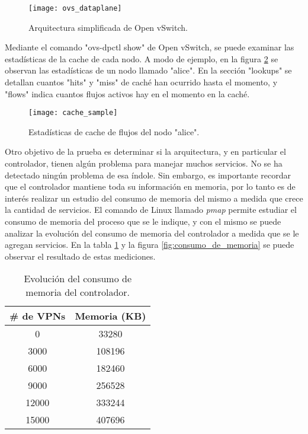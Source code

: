 \begin{figure}[t]
	\caption{Arquitectura simplificada de Open vSwitch.}
	\texttt{[image: ovs\_dataplane]}
	\centering
	\label{fig:ovs_dataplane}
\end{figure}

Mediante el comando "ovs-dpctl show" de Open vSwitch, se puede examinar las estadísticas de la cache de cada nodo. A modo de ejemplo, en la figura \ref{fig:cache_sample} se observan las estadísticas de un nodo llamado "alice". En la sección "lookups" se detallan cuantos "hits" y "miss" de caché han ocurrido hasta el momento, y "flows" indica cuantos flujos activos hay en el momento en la caché.

\begin{figure}[H]
	\caption{Estadísticas de cache de flujos del nodo "alice".}
	\texttt{[image: cache\_sample]}
	\centering
	\label{fig:cache_sample}
\end{figure}

Otro objetivo de la prueba es determinar si la arquitectura, y en particular el controlador, tienen algún problema para manejar muchos servicios. No se ha detectado ningún problema de esa índole. Sin embargo, es importante recordar que el controlador mantiene toda su información en memoria, por lo tanto es de interés realizar un estudio del consumo de memoria del mismo a medida que crece la cantidad de servicios. El comando de Linux llamado \textit{pmap} permite estudiar el consumo de memoria del proceso que se le indique, y con el mismo se puede analizar la evolución del consumo de memoria del controlador a medida que se le agregan servicios. En la tabla \ref{table:consumo_de_memoria} y la figura \ref{fig:consumo_de_memoria} se puede observar el resultado de estas mediciones. \\

\begin{table}[ht]
	\caption{Evolución del consumo de memoria del controlador.}
	\centering 
	\begin{tabular}{c c}
		\hline\hline
		\# de VPNs & Memoria (KB) \\ [0.5ex]
		\hline
		0 & 33280 \\
		3000 & 108196 \\
		6000 & 182460 \\
		9000 & 256528 \\
		12000 & 333244 \\
		15000 & 407696 \\ [1ex]
		\hline
	\end{tabular}
	\label{table:consumo_de_memoria}
\end{table}


